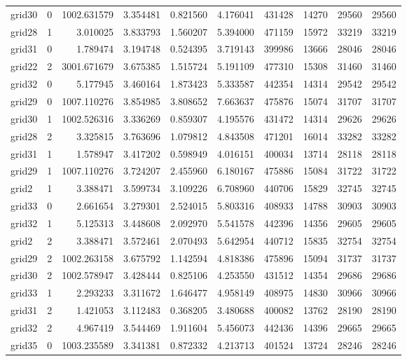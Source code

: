 \begin{longtable}{|l|r|r|r|r|r|r|r|r|r|}
grid30 & 0 & 1002.631579 & 3.354481 & 0.821560 & 4.176041 & 431428 & 14270 & 29560 & 29560 \\
grid28 & 1 & 3.010025 & 3.833793 & 1.560207 & 5.394000 & 471159 & 15972 & 33219 & 33219 \\
grid31 & 0 & 1.789474 & 3.194748 & 0.524395 & 3.719143 & 399986 & 13666 & 28046 & 28046 \\
grid22 & 2 & 3001.671679 & 3.675385 & 1.515724 & 5.191109 & 477310 & 15308 & 31460 & 31460 \\
grid32 & 0 & 5.177945 & 3.460164 & 1.873423 & 5.333587 & 442354 & 14314 & 29542 & 29542 \\
grid29 & 0 & 1007.110276 & 3.854985 & 3.808652 & 7.663637 & 475876 & 15074 & 31707 & 31707 \\
grid30 & 1 & 1002.526316 & 3.336269 & 0.859307 & 4.195576 & 431472 & 14314 & 29626 & 29626 \\
grid28 & 2 & 3.325815 & 3.763696 & 1.079812 & 4.843508 & 471201 & 16014 & 33282 & 33282 \\
grid31 & 1 & 1.578947 & 3.417202 & 0.598949 & 4.016151 & 400034 & 13714 & 28118 & 28118 \\
grid29 & 1 & 1007.110276 & 3.724207 & 2.455960 & 6.180167 & 475886 & 15084 & 31722 & 31722 \\
grid2 & 1 & 3.388471 & 3.599734 & 3.109226 & 6.708960 & 440706 & 15829 & 32745 & 32745 \\
grid33 & 0 & 2.661654 & 3.279301 & 2.524015 & 5.803316 & 408933 & 14788 & 30903 & 30903 \\
grid32 & 1 & 5.125313 & 3.448608 & 2.092970 & 5.541578 & 442396 & 14356 & 29605 & 29605 \\
grid2 & 2 & 3.388471 & 3.572461 & 2.070493 & 5.642954 & 440712 & 15835 & 32754 & 32754 \\
grid29 & 2 & 1002.263158 & 3.675792 & 1.142594 & 4.818386 & 475896 & 15094 & 31737 & 31737 \\
grid30 & 2 & 1002.578947 & 3.428444 & 0.825106 & 4.253550 & 431512 & 14354 & 29686 & 29686 \\
grid33 & 1 & 2.293233 & 3.311672 & 1.646477 & 4.958149 & 408975 & 14830 & 30966 & 30966 \\
grid31 & 2 & 1.421053 & 3.112483 & 0.368205 & 3.480688 & 400082 & 13762 & 28190 & 28190 \\
grid32 & 2 & 4.967419 & 3.544469 & 1.911604 & 5.456073 & 442436 & 14396 & 29665 & 29665 \\
grid35 & 0 & 1003.235589 & 3.341381 & 0.872332 & 4.213713 & 401524 & 13724 & 28246 & 28246 \\

\end{longtable}
